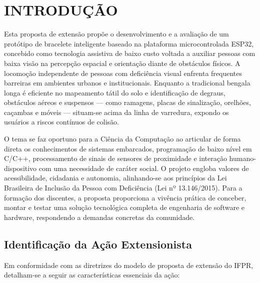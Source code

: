 \chapter{INTRODUÇÃO}
\label{capitulo-introducao-proposta}

Esta proposta de extensão propõe o desenvolvimento e a avaliação de um protótipo de bracelete inteligente baseado na plataforma microcontrolada ESP32, concebido como tecnologia assistiva de baixo custo voltada a auxiliar pessoas com baixa visão na percepção espacial e orientação diante de obstáculos físicos. A locomoção independente de pessoas com deficiência visual enfrenta frequentes barreiras em ambientes urbanos e institucionais. Enquanto a tradicional bengala longa é eficiente no mapeamento tátil do solo e identificação de degraus, obstáculos aéreos e suspensos --- como ramagens, placas de sinalização, orelhões, caçambas e móveis --- situam-se acima da linha de varredura, expondo os usuários a riscos contínuos de colisão.

O tema se faz oportuno para a Ciência da Computação ao articular de forma direta os conhecimentos de sistemas embarcados, programação de baixo nível em C/C++, processamento de sinais de sensores de proximidade e interação humano-dispositivo com uma necessidade de caráter social. O projeto engloba valores de acessibilidade, cidadania e autonomia, alinhando-se aos princípios da Lei Brasileira de Inclusão da Pessoa com Deficiência (Lei nº 13.146/2015). Para a formação dos discentes, a proposta proporciona a vivência prática de conceber, montar e testar uma solução tecnológica completa de engenharia de software e hardware, respondendo a demandas concretas da comunidade.

\section{Identificação da Ação Extensionista}
\label{sec:identificacao-acao-proposta}

Em conformidade com as diretrizes do modelo de proposta de extensão do IFPR, detalham-se a seguir as características essenciais da ação:

